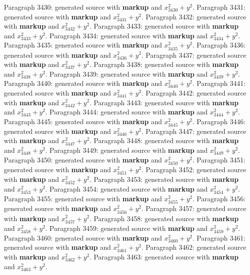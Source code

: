 \documentclass{article}
\begin{document}
Paragraph 3430: generated source with \textbf{markup} and $x_{3430}^2 + y^2$.
Paragraph 3431: generated source with \textbf{markup} and $x_{3431}^2 + y^2$.
Paragraph 3432: generated source with \textbf{markup} and $x_{3432}^2 + y^2$.
Paragraph 3433: generated source with \textbf{markup} and $x_{3433}^2 + y^2$.
Paragraph 3434: generated source with \textbf{markup} and $x_{3434}^2 + y^2$.
Paragraph 3435: generated source with \textbf{markup} and $x_{3435}^2 + y^2$.
Paragraph 3436: generated source with \textbf{markup} and $x_{3436}^2 + y^2$.
Paragraph 3437: generated source with \textbf{markup} and $x_{3437}^2 + y^2$.
Paragraph 3438: generated source with \textbf{markup} and $x_{3438}^2 + y^2$.
Paragraph 3439: generated source with \textbf{markup} and $x_{3439}^2 + y^2$.
Paragraph 3440: generated source with \textbf{markup} and $x_{3440}^2 + y^2$.
Paragraph 3441: generated source with \textbf{markup} and $x_{3441}^2 + y^2$.
Paragraph 3442: generated source with \textbf{markup} and $x_{3442}^2 + y^2$.
Paragraph 3443: generated source with \textbf{markup} and $x_{3443}^2 + y^2$.
Paragraph 3444: generated source with \textbf{markup} and $x_{3444}^2 + y^2$.
Paragraph 3445: generated source with \textbf{markup} and $x_{3445}^2 + y^2$.
Paragraph 3446: generated source with \textbf{markup} and $x_{3446}^2 + y^2$.
Paragraph 3447: generated source with \textbf{markup} and $x_{3447}^2 + y^2$.
Paragraph 3448: generated source with \textbf{markup} and $x_{3448}^2 + y^2$.
Paragraph 3449: generated source with \textbf{markup} and $x_{3449}^2 + y^2$.
Paragraph 3450: generated source with \textbf{markup} and $x_{3450}^2 + y^2$.
Paragraph 3451: generated source with \textbf{markup} and $x_{3451}^2 + y^2$.
Paragraph 3452: generated source with \textbf{markup} and $x_{3452}^2 + y^2$.
Paragraph 3453: generated source with \textbf{markup} and $x_{3453}^2 + y^2$.
Paragraph 3454: generated source with \textbf{markup} and $x_{3454}^2 + y^2$.
Paragraph 3455: generated source with \textbf{markup} and $x_{3455}^2 + y^2$.
Paragraph 3456: generated source with \textbf{markup} and $x_{3456}^2 + y^2$.
Paragraph 3457: generated source with \textbf{markup} and $x_{3457}^2 + y^2$.
Paragraph 3458: generated source with \textbf{markup} and $x_{3458}^2 + y^2$.
Paragraph 3459: generated source with \textbf{markup} and $x_{3459}^2 + y^2$.
Paragraph 3460: generated source with \textbf{markup} and $x_{3460}^2 + y^2$.
Paragraph 3461: generated source with \textbf{markup} and $x_{3461}^2 + y^2$.
Paragraph 3462: generated source with \textbf{markup} and $x_{3462}^2 + y^2$.
Paragraph 3463: generated source with \textbf{markup} and $x_{3463}^2 + y^2$.
\end{document}
